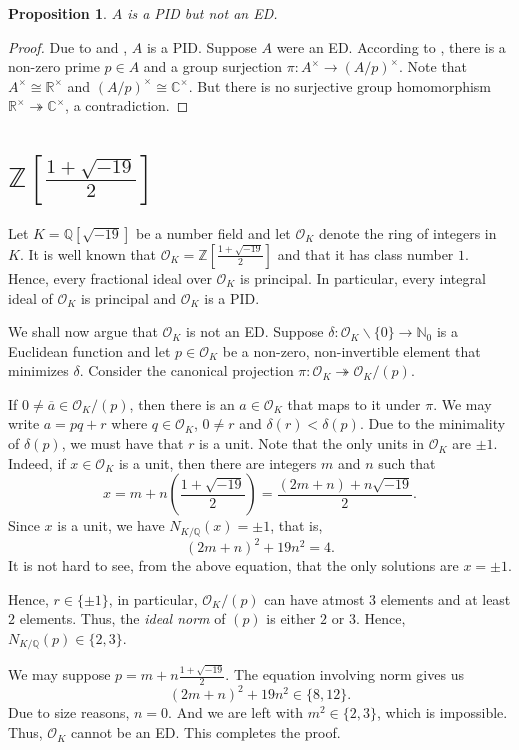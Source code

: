 \documentclass[12pt]{article}
\theoremstyle{thmstyle}
\newtheorem{proposition}[theorem]{Proposition}
\theoremstyle{defstyle}
\newcommand{\R}{\mathbb{R}}
\newcommand{\Q}{\mathbb{Q}}
\newcommand{\Z}{\mathbb{Z}}
\newcommand{\N}{\mathbb{N}}
\newcommand{\bbC}{\mathbb{C}}
\newcommand{\calO}{\mathcal{O}} %
\begin{document}
\begin{proposition}
    $A$ is a PID but not an ED.
\end{proposition}
\begin{proof}
    Due to  and , $A$ is a PID. Suppose $A$ were an ED. According to , there is a non-zero prime $p\in A$ and a group surjection $\pi: A^\times\to (A/p)^\times$. Note that $A^\times\cong\R^\times$ and $(A/p)^\times\cong\bbC^\times$. But there is no surjective group homomorphism $\R^\times\twoheadrightarrow\bbC^\times$, a contradiction.
\end{proof}

\section{\texorpdfstring{$\Z\left[\frac{1 + \sqrt{-19}}{2}\right]$}{}}
Let $K = \Q[\sqrt{-19}]$ be a number field and let $\mathcal O_K$ denote the ring of integers in $K$. It is well known that $\mathcal O_K = \Z\left[\frac{1 + \sqrt{-19}}{2}\right]$ and that it has class number $1$. Hence, every fractional ideal over $\mathcal O_K$ is principal. In particular, every integral ideal of $\mathcal O_K$ is principal and $\mathcal O_K$ is a PID.

We shall now argue that $\calO_K$ is not an ED. Suppose $\delta:\calO_K\backslash\{0\}\to\N_0$ is a Euclidean function and let $p\in\mathcal O_K$ be a non-zero, non-invertible element that minimizes $\delta$. Consider the canonical projection $\pi: \calO_K\twoheadrightarrow\calO_K/(p)$. 

If $0\ne\overline a\in\calO_K/(p)$, then there is an $a\in\calO_K$ that maps to it under $\pi$. We may write $a = pq + r$ where $q\in\calO_K$, $0\ne r$ and $\delta(r) < \delta(p)$. Due to the minimality of $\delta(p)$, we must have that $r$ is a unit. Note that the only units in $\calO_K$ are $\pm 1$. Indeed, if $x\in\calO_K$ is a unit, then there are integers $m$ and $n$ such that 
\begin{equation*}
    x = m + n\left(\frac{1 + \sqrt{-19}}{2}\right) = \frac{(2m + n) + n\sqrt{-19}}{2}.
\end{equation*}
Since $x$ is a unit, we have $N_{K/\Q}(x) = \pm 1$, that is, 
\begin{equation*}
    (2m + n)^2 + 19 n^2 = 4.
\end{equation*}
It is not hard to see, from the above equation, that the only solutions are $x = \pm 1$.

Hence, $r\in\{\pm 1\}$, in particular, $\calO_K/(p)$ can have atmost $3$ elements and at least $2$ elements. Thus, the \emph{ideal norm} of $(p)$ is either $2$ or $3$. Hence, $N_{K/\Q}(p)\in\{2, 3\}$.

We may suppose $p = m + n\frac{1 + \sqrt{-19}}{2}$. The equation involving norm gives us 
\begin{equation*}
    (2m + n)^2 + 19n^2\in\{8, 12\}.
\end{equation*}
Due to size reasons, $n = 0$. And we are left with $m^2\in\{2,3\}$, which is impossible. Thus, $\calO_K$ cannot be an ED. This completes the proof.
\end{document}

